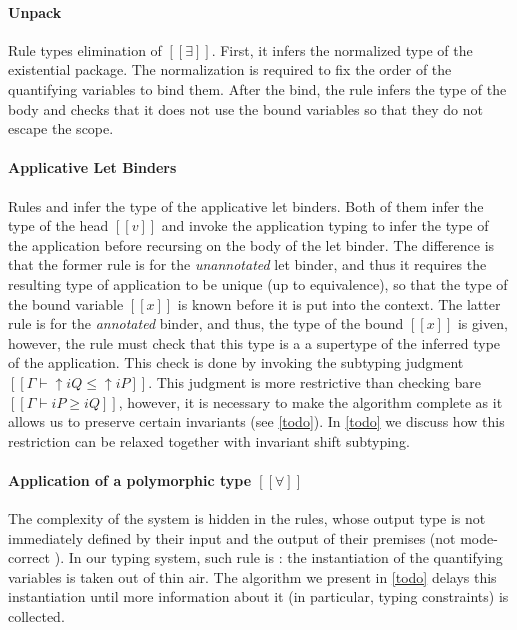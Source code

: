 \paragraph{Unpack}
  Rule  types elimination of $[[∃]]$.
  First, it infers the normalized type of the existential package.
  The normalization is required to fix the order of the quantifying variables
  to bind them. After the bind, the rule infers the type of the body 
  and checks that it does not use the bound variables so that they do not 
  escape the scope.

\paragraph{Applicative Let Binders}
  Rules  and 
  infer the type of the applicative let binders.
  Both of them infer the type of the head $[[v]]$ 
  and invoke the application typing to infer the type of the application 
  before recursing on the body of the let binder.
  The difference is that the former rule is for the 
  \emph{unannotated} let binder, and thus
  it requires the resulting type of application to be unique
  (up to equivalence), so that the type of the bound variable $[[x]]$
  is known before it is put into the context.
  The latter rule is for the \emph{annotated} binder,
  and thus, the type of the bound $[[x]]$ is given, 
  however, the rule must check that this type is a
  a supertype of the inferred type of the application. 
  This check is done by invoking the subtyping judgment
  $[[Γ ⊢ ↑iQ ≤ ↑iP]]$.
  This judgment is more restrictive than checking bare 
  $[[Γ ⊢ iP ≥ iQ]]$, however, it is necessary
  to make the algorithm complete as it allows us to preserve
  certain invariants (see \cref{todo}).
  In \cref{todo} we discuss how this restriction can be relaxed
  together with invariant shift subtyping.

\paragraph{Application of a polymorphic type $[[∀]]$}
  The complexity of the system is hidden in the rules, 
  whose output type is not immediately defined by their input
  and the output of their premises 
  (\aka not mode-correct \cite{dunfield2020:bidirectional}).
  In our typing system, such rule is : 
  the instantiation of the quantifying variables is
  taken out of thin air. The algorithm we present in \cref{todo} 
  delays this instantiation until more information about it 
  (in particular, typing constraints) is collected.

